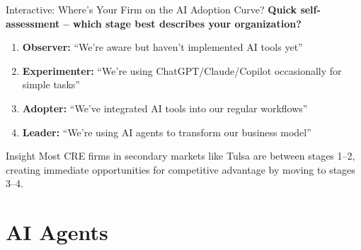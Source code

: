 \documentclass{beamer}
\begin{document}
\begin{frame}{Interactive: Where’s Your Firm on the AI Adoption Curve?}
  \textbf{Quick self-assessment – which stage best describes your organization?}
  \begin{enumerate}
    \item \textbf{Observer:} “We’re aware but haven’t implemented AI tools yet”
    \item \textbf{Experimenter:} “We’re using ChatGPT/Claude/Copilot occasionally for simple tasks”
    \item \textbf{Adopter:} “We’ve integrated AI tools into our regular workflows”
    \item \textbf{Leader:} “We’re using AI agents to transform our business model”
  \end{enumerate}

  \pause
  \begin{block}{Insight}
    Most CRE firms in secondary markets like Tulsa are between stages 1–2,
    creating immediate opportunities for competitive advantage by moving to
    stages 3–4.
  \end{block}
\end{frame}

\section{AI Agents}
\end{document}
